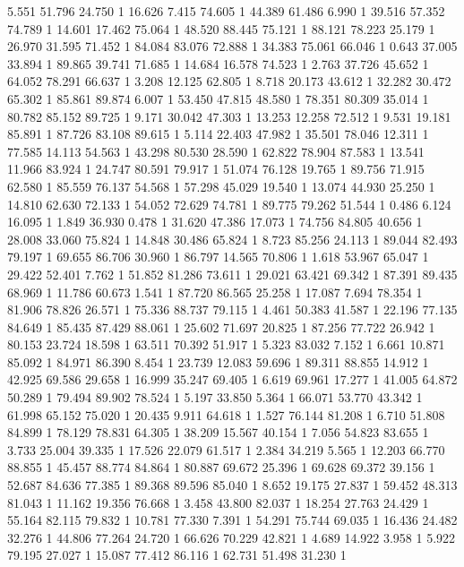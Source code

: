	5.551	51.796	24.750	1
	16.626	7.415	74.605	1
	44.389	61.486	6.990	1
	39.516	57.352	74.789	1
	14.601	17.462	75.064	1
	48.520	88.445	75.121	1
	88.121	78.223	25.179	1
	26.970	31.595	71.452	1
	84.084	83.076	72.888	1
	34.383	75.061	66.046	1
	0.643	37.005	33.894	1
	89.865	39.741	71.685	1
	14.684	16.578	74.523	1
	2.763	37.726	45.652	1
	64.052	78.291	66.637	1
	3.208	12.125	62.805	1
	8.718	20.173	43.612	1
	32.282	30.472	65.302	1
	85.861	89.874	6.007	1
	53.450	47.815	48.580	1
	78.351	80.309	35.014	1
	80.782	85.152	89.725	1
	9.171	30.042	47.303	1
	13.253	12.258	72.512	1
	9.531	19.181	85.891	1
	87.726	83.108	89.615	1
	5.114	22.403	47.982	1
	35.501	78.046	12.311	1
	77.585	14.113	54.563	1
	43.298	80.530	28.590	1
	62.822	78.904	87.583	1
	13.541	11.966	83.924	1
	24.747	80.591	79.917	1
	51.074	76.128	19.765	1
	89.756	71.915	62.580	1
	85.559	76.137	54.568	1
	57.298	45.029	19.540	1
	13.074	44.930	25.250	1
	14.810	62.630	72.133	1
	54.052	72.629	74.781	1
	89.775	79.262	51.544	1
	0.486	6.124	16.095	1
	1.849	36.930	0.478	1
	31.620	47.386	17.073	1
	74.756	84.805	40.656	1
	28.008	33.060	75.824	1
	14.848	30.486	65.824	1
	8.723	85.256	24.113	1
	89.044	82.493	79.197	1
	69.655	86.706	30.960	1
	86.797	14.565	70.806	1
	1.618	53.967	65.047	1
	29.422	52.401	7.762	1
	51.852	81.286	73.611	1
	29.021	63.421	69.342	1
	87.391	89.435	68.969	1
	11.786	60.673	1.541	1
	87.720	86.565	25.258	1
	17.087	7.694	78.354	1
	81.906	78.826	26.571	1
	75.336	88.737	79.115	1
	4.461	50.383	41.587	1
	22.196	77.135	84.649	1
	85.435	87.429	88.061	1
	25.602	71.697	20.825	1
	87.256	77.722	26.942	1
	80.153	23.724	18.598	1
	63.511	70.392	51.917	1
	5.323	83.032	7.152	1
	6.661	10.871	85.092	1
	84.971	86.390	8.454	1
	23.739	12.083	59.696	1
	89.311	88.855	14.912	1
	42.925	69.586	29.658	1
	16.999	35.247	69.405	1
	6.619	69.961	17.277	1
	41.005	64.872	50.289	1
	79.494	89.902	78.524	1
	5.197	33.850	5.364	1
	66.071	53.770	43.342	1
	61.998	65.152	75.020	1
	20.435	9.911	64.618	1
	1.527	76.144	81.208	1
	6.710	51.808	84.899	1
	78.129	78.831	64.305	1
	38.209	15.567	40.154	1
	7.056	54.823	83.655	1
	3.733	25.004	39.335	1
	17.526	22.079	61.517	1
	2.384	34.219	5.565	1
	12.203	66.770	88.855	1
	45.457	88.774	84.864	1
	80.887	69.672	25.396	1
	69.628	69.372	39.156	1
	52.687	84.636	77.385	1
	89.368	89.596	85.040	1
	8.652	19.175	27.837	1
	59.452	48.313	81.043	1
	11.162	19.356	76.668	1
	3.458	43.800	82.037	1
	18.254	27.763	24.429	1
	55.164	82.115	79.832	1
	10.781	77.330	7.391	1
	54.291	75.744	69.035	1
	16.436	24.482	32.276	1
	44.806	77.264	24.720	1
	66.626	70.229	42.821	1
	4.689	14.922	3.958	1
	5.922	79.195	27.027	1
	15.087	77.412	86.116	1
	62.731	51.498	31.230	1
